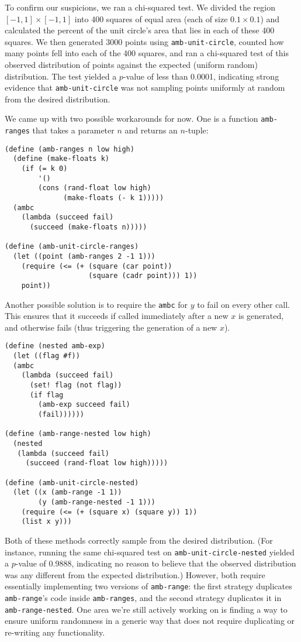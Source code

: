 \documentclass{article}
\begin{document}
To confirm our suspicions, we ran a chi-squared test. We divided the
region $[-1,1]\times[-1,1]$ into 400 squares of equal area (each of
size $0.1\times 0.1$) and calculated the percent of the unit circle's
area that lies in each of these 400 squares. We then generated 3000
points using \texttt{amb-unit-circle}, counted how many points fell
into each of the 400 squares, and ran a chi-squared test of this
observed distribution of points against the expected (uniform random)
distribution. The test yielded a $p$-value of less than 0.0001,
indicating strong evidence that \texttt{amb-unit-circle} was not
sampling points uniformly at random from the desired distribution.

We came up with two possible workarounds for now. One is a function
\texttt{amb-ranges} that takes a parameter $n$ and returns an $n$-tuple:
\begin{lstlisting}
(define (amb-ranges n low high)
  (define (make-floats k)
    (if (= k 0)
        '()
        (cons (rand-float low high)
              (make-floats (- k 1)))))
  (ambc
    (lambda (succeed fail)
      (succeed (make-floats n)))))

(define (amb-unit-circle-ranges)
  (let ((point (amb-ranges 2 -1 1)))
    (require (<= (+ (square (car point))
                    (square (cadr point))) 1))
    point))
\end{lstlisting}

Another possible solution is to require the \texttt{ambc} for $y$ to fail on
every other call. This ensures that it succeeds if called immediately after a
new $x$ is generated, and otherwise fails (thus triggering the generation of a
new $x$).
\begin{lstlisting}
(define (nested amb-exp)
  (let ((flag #f))
  (ambc
    (lambda (succeed fail)
      (set! flag (not flag))
      (if flag
        (amb-exp succeed fail)
        (fail))))))

(define (amb-range-nested low high)
  (nested
   (lambda (succeed fail)
     (succeed (rand-float low high)))))

(define (amb-unit-circle-nested)
  (let ((x (amb-range -1 1))
        (y (amb-range-nested -1 1)))
    (require (<= (+ (square x) (square y)) 1))
    (list x y)))
\end{lstlisting}

Both of these methods correctly sample from the desired
distribution. (For instance, running the same chi-squared test on
\texttt{amb-unit-circle-nested} yielded a $p$-value of 0.9888,
indicating no reason to believe that the observed distribution was any
different from the expected distribution.)  However, both require
essentially implementing two versions of \texttt{amb-range}: the first
strategy duplicates \texttt{amb-range}'s code inside
\texttt{amb-ranges}, and the second strategy duplicates it in
\texttt{amb-range-nested}. One area we're still actively working on is
finding a way to ensure uniform randomness in a generic way that does
not require duplicating or re-writing any functionality.
\end{document}
